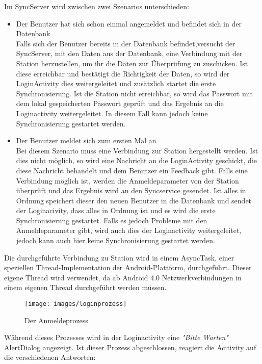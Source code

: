 Im SyncServer wird zwischen zwei Szenarios unterschieden:

\begin{itemize}
\item{Der Benutzer hat sich schon einmal angemeldet und befindet sich in der Datenbank}\\
Falls sich der Benutzer bereits in der Datenbank befindet,versucht der SyncServer, mit den Daten aus der Datenbank, eine Verbindung mit der Station herzustellen, um ihr die Daten zur Überprüfung zu zuschicken.
Ist diese erreichbar und bestätigt die Richtigkeit der Daten, so wird der LoginActivity dies weitergeleitet und zusätzlich startet die erste Synchronisierung.
Ist die Station nicht erreichbar, so wird das Passwort mit dem lokal gespeicherten Passwort geprüft und das Ergebnis an die Loginactivity weitergeleitet. In diesem Fall kann jedoch keine Synchronisierung gestartet werden.

\item{Der Benutzer meldet sich zum ersten Mal an}\\
Bei diesem Szenario muss eine Verbindung zur Station hergestellt werden. Ist dies nicht möglich, so wird eine Nachricht an die LoginActivity geschickt, die diese Nachricht behandelt und dem Benutzer ein Feedback gibt.
Falls eine Verbindung möglich ist, werden die Anmeldeparameter von der Station überprüft und das Ergebnis wird an den Syncservice gesendet. Ist alles in Ordnung speichert dieser den neuen Benutzer in die Datenbank und sendet der Loginacivity, dass alles in Ordnung ist und es wird die erste Synchronisierung gestartet. Falls es jedoch Probleme mit den Anmeldeparameter gibt, wird auch dies der Loginactivity weitergeleitet, jedoch kann auch hier keine Synchronisierung gestartet werden.

\end{itemize}
Die durchgeführte Verbindung zu Station wird in einem  AsyncTask, einer speziellen Thread-Implementation der Android-Plattform, durchgeführt. Dieser eigene Thread wird verwendet, da ab Android 4.0 Netzwerkverbindungen in einem eigenen Thread durchgeführt werden müssen.




\begin{figure}[htbp]
\centering
    \texttt{[image: images/loginprozess]}
\caption{Der Anmeldeprozess}
\end{figure}
\newpage

Während dieses Prozesses wird in der Loginactivity eine \textit{"Bitte Warten"} AlertDialog angezeigt. 
Ist dieser Prozess abgeschlossen, reagiert die Acitivity auf die verschiedenen Antworten:


